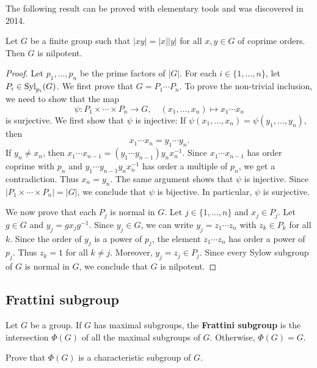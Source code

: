 The following result can be proved with elementary tools 
and was discovered 
in 2014. 

\begin{theorem}
Let $G$ be a finite group such that $|xy|=|x||y|$ for all $x,y\in G$ of coprime orders. 
Then $G$ is nilpotent. 
\end{theorem}

\begin{proof}
Let $p_1,\dots,p_n$ be the prime factors of $|G|$. For 
each 
$i\in\{1,\dots,n\}$, let $P_i\in\mathrm{Syl}_{p_i}(G)$. We first prove that 
$G=P_1\cdots P_n$. To prove the non-trivial inclusion, we need to show that 
the map
\[
	\psi\colon P_1\times\cdots\times P_n\to G,\quad
	(x_1,\dots,x_n)\mapsto x_1\cdots x_n
\]
is surjective. We first show that $\psi$ is injective: If 
$\psi(x_1,\dots,x_n)=\psi(y_1,\dots,y_n)$, then 
\[
x_1\cdots x_n=y_1\cdots y_n. 
\]
If $y_n\ne x_n$, then $x_1\cdots x_{n-1}=(y_1\cdots
y_{n-1})y_nx_n^{-1}$. Since $x_1\cdots x_{n-1}$ has order coprime with 
$p_n$ and $y_1\cdots y_{n-1}y_nx_n^{-1}$ has order a multiple of 
$p_n$, we get a contradiction. Thus  $x_n=y_n$. The same argument shows that 
$\psi$ is injective. Since $|P_1\times\cdots\times
P_n|=|G|$, we conclude that $\psi$ is bijective. In particular, 
$\psi$ is surjective. 

We now prove that each $P_j$ is normal in $G$. Let $j\in\{1,\dots,n\}$ and 
$x_j\in P_j$. Let $g\in G$ and $y_j=gx_jg^{-1}$.  Since $y_j\in G$,
we can write $y_j=z_1\cdots z_n$ with $z_k\in P_k$ for all $k$.  Since
the order of $y_j$ is a power of $p_j$, the element $z_1\cdots
z_n$ has order a power of $p_j$. Thus $z_k=1$ for all $k\ne j$. Moreover, 
$y_j=z_j\in P_j$. Since every Sylow subgroup of $G$ is normal in $G$, 
we conclude that $G$ is nilpotent. 
\end{proof}




\subsection{Frattini subgroup}

\begin{definition}
Let $G$ be a group. If $G$ has maximal subgroups, 
the \textbf{Frattini subgroup} is the intersection 
$\Phi(G)$ of all the maximal subgroups of $G$. 
Otherwise, 
$\Phi(G)=G$. 
\end{definition}

\begin{exercise}
\label{xca:Phi(G)char}
Prove that $\Phi(G)$ is a characteristic subgroup of $G$. 
\end{exercise}

